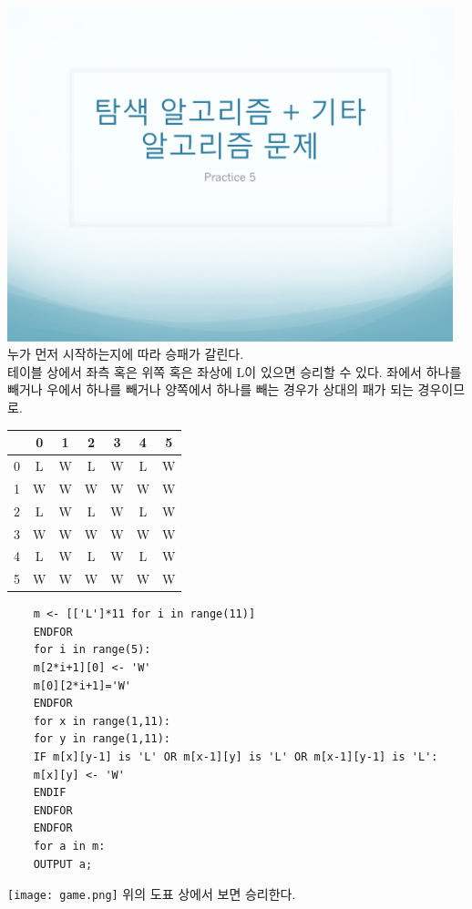 \documentclass[12pt,a4paper]{article}
\begin{document}
\includegraphics[page=6, width=0.97\textwidth]{1.pdf}
누가 먼저 시작하는지에 따라 승패가 갈린다. \\
테이블 상에서 좌측 혹은 위쪽 혹은 좌상에 L이 있으면 승리할 수 있다. 좌에서 하나를 빼거나 우에서 하나를 빼거나 양쪽에서 하나를 빼는 경우가 상대의 패가 되는 경우이므로.\\
\begin{tabular}{|c|c|c|c|c|c|c|}
	\hline
	&0&1&2&3&4&5\\
	\hline
	0&L&W&L&W&L&W\\
	\hline
	1&W&W&W&W&W&W\\
	\hline
	2&L&W&L&W&L&W\\
	\hline
	3&W&W&W&W&W&W\\
	\hline
	4&L&W&L&W&L&W\\
	\hline
	5&W&W&W&W&W&W\\
	\hline
\end{tabular}
\vspace{1cm}
\begin{lstlisting}
	m <- [['L']*11 for i in range(11)]
	ENDFOR
	for i in range(5):
	m[2*i+1][0] <- 'W'
	m[0][2*i+1]='W'
	ENDFOR
	for x in range(1,11):
	for y in range(1,11):
	IF m[x][y-1] is 'L' OR m[x-1][y] is 'L' OR m[x-1][y-1] is 'L':
	m[x][y] <- 'W'
	ENDIF
	ENDFOR
	ENDFOR
	for a in m:
	OUTPUT a;
\end{lstlisting}

\texttt{[image: game.png]}
위의 도표 상에서 보면 승리한다.
\end{document}
